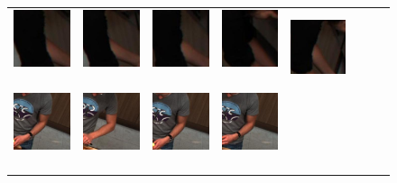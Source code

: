 \documentclass[runningheads]{llncs}
\begin{document}
\begin{figure}[t]
\begin{center}
\begin{tabular}{@{}c@{}c@{}c@{}c@{}c@{}c@{}c@{}c@{}}
\includegraphics[height=0.10\linewidth]{figures/biposelets/poselet-289/sample-3-f0.jpg}\,&
\includegraphics[height=0.10\linewidth]{figures/biposelets/poselet-289/sample-4-f0.jpg}\,&
\includegraphics[height=0.10\linewidth]{figures/biposelets/poselet-289/sample-5-f0.jpg}\,&
\includegraphics[height=0.10\linewidth]{figures/biposelets/poselet-289/sample-6-f0.jpg}\,&
\includegraphics[height=0.10\linewidth]{figures/biposelets/poselet-289/sample-7-f0.jpg}\\
%
\includegraphics[height=0.10\linewidth]{figures/biposelets/poselet-297/sample-1-f0.jpg}\,&
\includegraphics[height=0.10\linewidth]{figures/biposelets/poselet-297/sample-2-f0.jpg}\,&
\includegraphics[height=0.10\linewidth]{figures/biposelets/poselet-297/sample-3-f0.jpg}\,&
\includegraphics[height=0.10\linewidth]{figures/biposelets/poselet-297/sample-4-f0.jpg}\,&

\end{tabular}
\end{center}
\end{figure}
\end{document}
